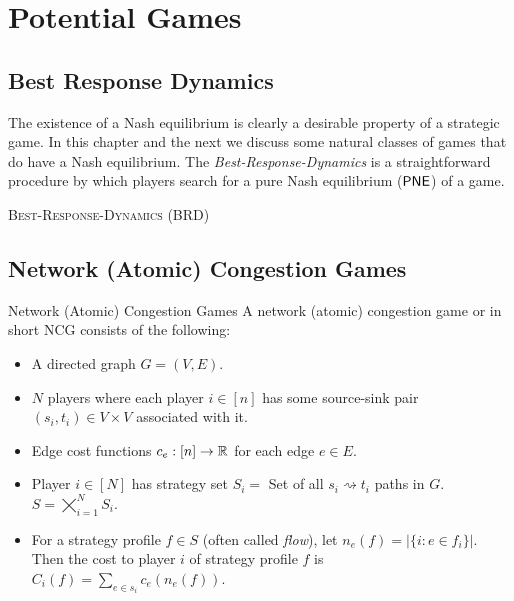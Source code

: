 \chapter{Potential Games}
\section{Best Response Dynamics}
The existence of a Nash equilibrium is clearly a desirable property of a strategic game. In this chapter and the next we discuss some natural classes of games that do have a Nash equilibrium. The \textit{Best-Response-Dynamics} is a straightforward procedure by which players search for a pure
Nash equilibrium ($\operatorname{\mathsf{PNE}}$) of a game. 

\begin{algorithm}\DontPrintSemicolon
{}
	
\caption{\textsc{Best-Response-Dynamics} (\textsf{BRD})}
\end{algorithm}



\section{Network (Atomic) Congestion Games}
\begin{definition}{Network (Atomic) Congestion Games}{}
	A network (atomic) congestion game or in short NCG consists of the following:
	\begin{itemize}[itemsep=-1mm]
		\item A directed graph $G=(V,E)$.
		\item $N$ players where  each player $i\in[n]$ has some source-sink pair $(s_i,t_i)\in V\times V$ associated with it.
		\item Edge cost functions $c_e:[n]\to \mathbb{R}$ for each edge $e\in E$.
		\item Player $i\in[N]$ has strategy set $S_i=$ Set of all $s_i\rightsquigarrow t_i$ paths in $G$. $S=\bigtimes\limits_{i=1}^N S_i$.
		\item For a strategy profile $f\in S$ (often called \textit{flow}), let $n_e(f)=|\{i\colon e\in f_i\}|$. Then the cost to player $i$ of strategy profile $f$ is $C_i(f)=\sum\limits_{e\in s_i}c_e(n_e(f))$. 
	\end{itemize}
\end{definition}

